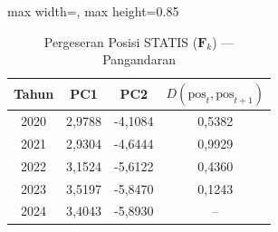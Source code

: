 \begin{table}[H]
\centering
\caption{Pergeseran Posisi STATIS ($\mathbf{F}_k$) --- Pangandaran} \label{tab:app2jarak_statis_skor_pangandaran}
\begin{adjustbox}{max width=\textwidth, max height=0.85\textheight}
\begin{tabular}{|c|c|c|c|}
\hline
\textbf{Tahun} & \textbf{PC1} & \textbf{PC2} & \textbf{$D(\text{pos}_t, \text{pos}_{t+1})$} \\
\hline
2020 & 2,9788 & -4,1084 & 0,5382 \\
2021 & 2,9304 & -4,6444 & 0,9929 \\
2022 & 3,1524 & -5,6122 & 0,4360 \\
2023 & 3,5197 & -5,8470 & 0,1243 \\
2024 & 3,4043 & -5,8930 & -- \\
\hline
\end{tabular}
\end{adjustbox}
\end{table}